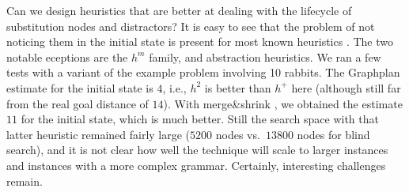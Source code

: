 

Can we design heuristics that are better at dealing with the lifecycle
of substitution nodes and distractors? It is easy to see that the
problem of not noticing them in the initial state is present for most
known heuristics
\cite{helmert:icaps-04,richter:etal:aaai-08,karpas:domshlak-ijcai-09,helmert:domshlak:icaps-09,cai:etal:icaps-09}. The
two notable eceptions are the $h^m$ family, and abstraction
heuristics. We ran a few tests with a variant of the example problem
involving 10 rabbits.  The Graphplan estimate for the initial state is
$4$, i.e., $h^2$ is better than $h^+$ here (although still far from
the real goal distance of $14$). With merge\&shrink
\cite{helmert:etal:icaps07}, we obtained the estimate $11$ for the
initial state, which is much better. Still the search space with that
latter heuristic remained fairly large ($5200$ nodes vs.\ $13800$
nodes for blind search), and it is not clear how well the technique
will scale to larger instances and instances with a more complex
grammar. Certainly, interesting challenges remain.







